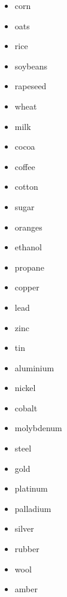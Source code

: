 \documentclass[]{book}
\providecommand{\tightlist}{%
  \setlength{\itemsep}{0pt}\setlength{\parskip}{0pt}}
\theoremstyle{definition}
\theoremstyle{definition}
\theoremstyle{definition}
\theoremstyle{remark}
\begin{document}
\begin{itemize}
\tightlist
\item
  corn
\item
  oats
\item
  rice\\
\item
  soybeans\\
\item
  rapeseed\\
\item
  wheat\\
\item
  milk\\
\item
  cocoa\\
\item
  coffee\\
\item
  cotton\\
\item
  sugar\\
\item
  oranges\\
\item
  ethanol\\
\item
  propane\\
\item
  copper\\
\item
  lead\\
\item
  zinc\\
\item
  tin\\
\item
  aluminium
\item
  nickel\\
\item
  cobalt\\
\item
  molybdenum
\item
  steel\\
\item
  gold\\
\item
  platinum
\item
  palladium
\item
  silver
\item
  rubber
\item
  wool
\item
  amber
\end{itemize}
\end{document}
